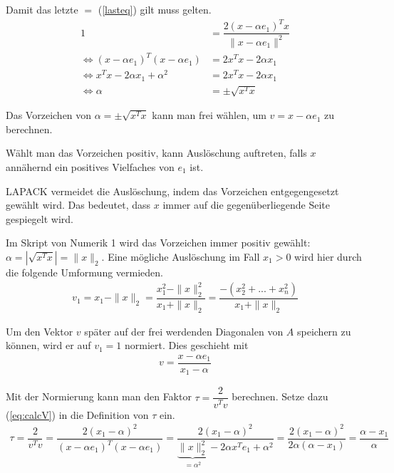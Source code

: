Damit das letzte $=$ (\ref{lasteq}) gilt muss gelten.
\begin{align*}
	1 &= \dfrac{2(x - \alpha e_1)^Tx}{\|x - \alpha e_1\|^2}\\
	\Leftrightarrow (x - \alpha e_1)^T(x - \alpha e_1) &= 2 x^T x - 2\alpha x_1 \\
	\Leftrightarrow x^Tx -2\alpha x_1 + \alpha^2 &= 2 x^T x - 2\alpha x_1\\
	\Leftrightarrow \alpha &= \pm \sqrt{x^Tx}
\end{align*}

Das Vorzeichen von  $\alpha = \pm \sqrt{x^Tx}$ kann man frei wählen, um $ v = x - \alpha e_1$ zu berechnen.

Wählt man das Vorzeichen positiv, kann Auslöschung auftreten, falls $x$ annähernd ein positives Vielfaches von $e_1$ ist.

LAPACK \cite{DGEQR2} vermeidet die Auslöschung, indem das Vorzeichen entgegengesetzt gewählt wird. Das bedeutet, dass $x$ immer auf die gegenüberliegende Seite gespiegelt wird.

Im Skript von Numerik 1 \cite{num1} wird das Vorzeichen immer positiv gewählt:\\ $\alpha = |\sqrt{x^Tx}| = \|x\|_2$. Eine mögliche Auslöschung im Fall $ x_1 > 0$ wird hier durch die folgende Umformung vermieden.
\begin{align*}
	v_1 = x_1 - \|x\|_2 = \dfrac{x_1^2 - \|x\|_2^2}{x_1 + \|x\|_2}
	=\dfrac{-(x_2^2+...+x_n^2)}{x_1 + \|x\|_2}
\end{align*}


Um den Vektor $v$ später auf der frei werdenden Diagonalen von $A$ speichern zu können, wird er auf $v_1 = 1$ normiert. Dies geschieht mit 
\begin{align}
v = \dfrac{x - \alpha e_1}{x_1 - \alpha}
\label{eq:calcV}
\end{align}

Mit der Normierung kann man den Faktor $\tau = \dfrac{2}{v^Tv}$ berechnen. Setze dazu (\ref{eq:calcV}) in die Definition von $\tau$ ein.
\begin{align*}
\tau = \dfrac{2}{v^Tv} = \dfrac{2 (x_1 - \alpha)^2}{(x - \alpha e_1)^T (x - \alpha e_1)} = \dfrac{2 (x_1 - \alpha)^2}{\underbrace{\|x\|^2_2}_{ = \alpha^2} - 2\alpha x^Te_1 + \alpha^2} =  \dfrac{2 (x_1 - \alpha)^2}{ 2\alpha (\alpha - x_1)} = \dfrac{\alpha - x_1}{\alpha}
\end{align*}

